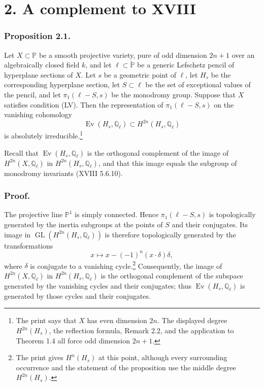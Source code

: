 \section*{2. A complement to XVIII}

\subsubsection*{Proposition 2.1.}
Let $X\subset\mathbb P$ be a smooth projective variety, pure of odd
dimension $2n+1$ over an algebraically closed field $k$, and let
$\ell\subset\check{\mathbb P}$ be a generic Lefschetz pencil of hyperplane
sections of $X$.  Let $s$ be a geometric point of $\ell$, let $H_s$ be the
corresponding hyperplane section, let $S\subset\ell$ be the set of exceptional
values of the pencil, and let $\pi_1(\ell-S,s)$ be the monodromy group.
Suppose that $X$ satisfies condition (LV).  Then the representation of
$\pi_1(\ell-S,s)$ on the vanishing cohomology
\[
\operatorname{Ev}(H_s,\mathbb Q_\ell)
\subset H^{2n}(H_s,\mathbb Q_\ell)
\]
is absolutely irreducible.\footnote{The print says that $X$ has even
dimension $2n$.  The displayed degree $H^{2n}(H_s)$, the reflection formula,
Remark 2.2, and the application to Theorem 1.4 all force odd dimension
$2n+1$.}

Recall that $\operatorname{Ev}(H_s,\mathbb Q_\ell)$ is the orthogonal
complement of the image of $H^{2n}(X,\mathbb Q_\ell)$ in
$H^{2n}(H_s,\mathbb Q_\ell)$, and that this image equals the subgroup of
monodromy invariants (XVIII 5.6.10).

\subsubsection*{Proof.}
The projective line $\mathbb P^1$ is simply connected.  Hence
$\pi_1(\ell-S,s)$ is topologically generated by the inertia subgroups at the
points of $S$ and their conjugates.  Its image in
$\operatorname{GL}(H^{2n}(H_s,\mathbb Q_\ell))$ is therefore topologically
generated by the transformations
\[
x\longmapsto x-(-1)^n(x\cdot\delta)\delta,
\]
where $\delta$ is conjugate to a vanishing cycle.\footnote{The print gives
$H^n(H_s)$ at this point, although every surrounding occurrence and the
statement of the proposition use the middle degree $H^{2n}(H_s)$.}
Consequently, the image of $H^{2n}(X,\mathbb Q_\ell)$ in
$H^{2n}(H_s,\mathbb Q_\ell)$ is the orthogonal complement of the subspace
generated by the vanishing cycles and their conjugates; thus
$\operatorname{Ev}(H_s,\mathbb Q_\ell)$ is generated by those cycles and
their conjugates.

